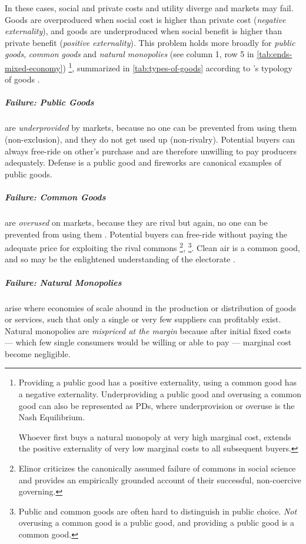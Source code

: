In these cases, social and private costs and utility diverge and markets may fail. 
Goods are overproduced when social cost is higher than private cost (\emph{negative externality}), and goods are underproduced when social benefit is higher than private benefit (\emph{positive externality}). 
This problem holds more broadly for \emph{public goods}, \emph{common goods} and \emph{natural monopolies} (see column 1, row 5 in \autoref{tab:ends-mixed-economy})
\footnote{
	Providing a public good has a positive externality, using a common good has a negative externality. 
	Underproviding a public good and overusing a common good can also be represented as \glspl{PD}, where underprovision or overuse is the Nash Equilibrium. 
	
	Whoever first buys a natural monopoly at very high marginal cost, extends the positive externality of very low marginal costs to all subsequent buyers.
}, 
summarized in \autoref{tab:types-of-goods} according to \citeauthor{Samuelson-1954-eu}'s typology of goods \citeyearpar{Samuelson-1954-eu}. 



\subparagraph{Failure: Public Goods}  \label{sec:public-good} are \emph{underprovided} by markets, because no one can be prevented from using them (non-exclusion), and they do not get used up (non-rivalry). 
Potential buyers can always free-ride on other's purchase and are therefore unwilling to pay producers adequately. 
Defense is a public good and fireworks are canonical examples of public goods.

\subparagraph{Failure: Common Goods}  \label{sec:common-good} are \emph{overused} on markets, because they are rival but again, no one can be prevented from using them \citep{Hardin-1968-aa}. 
Potential buyers can free-ride without paying the adequate price for exploiting the rival commons \citep{Hardin-1968-aa}
\footnote{
	Elinor \cite{Ostrom1990} criticizes the canonically assumed failure of commons in social science and provides an empirically grounded account of their successful, non-coercive governing.
}, 
\footnote{
	Public and common goods are often hard to distinguish in public choice. 
	\emph{Not} overusing a common good is a public good, and providing a public good is a common good.
}.
Clean air is a common good, and so may be the enlightened understanding of the electorate \citep{Caplan2007}.

\subparagraph{Failure: Natural Monopolies}  \label{sec:natural-monopoly} 
arise where economies of scale abound in the production or distribution of goods or services, such that only a single or very few suppliers can profitably exist. 
Natural monopolies are \emph{mispriced at the margin} because after initial fixed costs --- which few single consumers would be willing or able to pay --- marginal cost become negligible.

